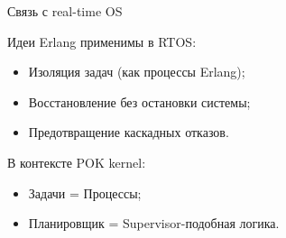 \begin{frame}{Связь с real-time OS}
	
	Идеи Erlang применимы в RTOS:
	
	\begin{itemize}
		\item Изоляция задач (как процессы Erlang);
		\item Восстановление без остановки системы;
		\item Предотвращение каскадных отказов.
	\end{itemize}
	
	\vspace{0.5em}
	
	В контексте POK kernel:
	\begin{itemize}
		\item Задачи = Процессы;
		\item Планировщик = Supervisor-подобная логика.
	\end{itemize}
\end{frame}